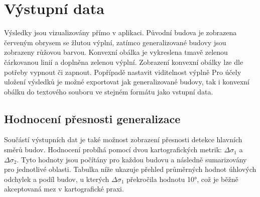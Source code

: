 \section{Výstupní data}
Výsledky jsou vizualizovány přímo v aplikaci. Původní budova je zobrazena červeným obrysem se žlutou výplní, zatímco generalizované budovy jsou zobrazeny růžovou barvou. Konvexní obálka je vykreslena tmavě zelenou čárkovanou linií a doplněna zelenou výplní. Zobrazení konvexní obálky lze dle potřeby vypnout či zapnout. Popřípadě nastavit viditelnost výplně
Pro účely uložení výsledků je možné exportovat jak generalizované budovy, tak i konvexní obálku do textového souboru ve stejném formátu jako vstupní data.

\subsection*{Hodnocení přesnosti generalizace}

Součástí výstupních dat je také možnost zobrazení přesnosti detekce hlavních směrů budov. Hodnocení probíhá pomocí dvou kartografických metrik: $\Delta \sigma_1$ a $\Delta \sigma_2$. Tyto hodnoty jsou počítány pro každou budovu a následně sumarizovány pro jednotlivé oblasti. Tabulka níže ukazuje přehled průměrných hodnot úhlových odchylek a podíl budov, u kterých $\Delta \sigma_1$ překročila hodnotu 10°, což je běžně akceptovaná mez v kartografické praxi.

